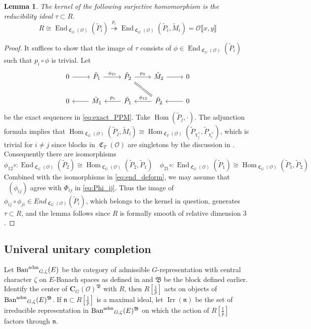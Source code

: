 \documentclass[leqno]{amsart}
\newtheorem{lem}[thm]{Lemma}
\theoremstyle{definition}
\theoremstyle{remark}
\newcommand{\oo}{\mathcal{O}}
\newcommand{\C}{\mathbf C}
\DeclareMathOperator{\End}{End}
\DeclareMathOperator{\Hom}{Hom}
\newcommand{\fn}{\mathfrak{n}}
\DeclareMathOperator{\fC}{\mathfrak{C}} %
\DeclareMathOperator{\Ban}{\textnormal{Ban}^{\textnormal{adm}}}
\DeclareMathOperator{\V}{\check{\mathbf{V}}} %
\DeclareMathOperator{\Irr}{Irr}
\newcommand{\B}{\mathfrak B} %
\begin{document}
\begin{lem}\label{lem:ker_red}
	The kernel of the following 
	surjective homomorphism 
	is the reducibility ideal $\tau\subset R$.
	\begin{equation}
	R\cong 
	\End_{\fC_G(\oo)}(\tilde{P}_i)
	\overset{p_i}{\twoheadrightarrow}
	\End_{\fC_G(\oo)}(\tilde{P}_i, \tilde{M}_i)=
	\oo\llbracket x,y\rrbracket
	\end{equation}
\end{lem}
\begin{proof}
It suffices to show that 
the image of $\tau$ consists of 
$\phi\in \End_{\fC_G(\oo)}(\tilde{P}_i)$
such that $p_i\circ \phi$ is trivial.
Let
\[
\begin{tikzcd}
	0 \arrow[r]&
	\tilde{P}_1  \arrow[r,"\phi_{21}"]  &
	\tilde{P}_2 \arrow[r,"p_2"] \arrow[dr,equal] &
	\tilde{M}_2  \arrow[r] & 0 \\
	0 & 
	\tilde{M}_1 \arrow[l]&
	\tilde{P}_1 \arrow[l,"p_1",swap]  &
	\tilde{P}_2  \arrow[l,"\phi_{12}",swap]  & 
	0  \arrow[l] 
\end{tikzcd}
\]
be the exact sequences in \eqref{eq:exact_PPM}.
Take $\Hom(\tilde{P}_j,\cdot)$.
The adjunction formula implies that
$\Hom_{\fC_G(\oo)}(\tilde{P}_j,\tilde{M}_i)\cong
\Hom_{\fC_T(\oo)}
(\tilde{P}_{\chi_j^\vee},\tilde{P}_{\chi_i^\vee})$,
which is trivial for $i\neq j$
since blocks in $\fC_T(\oo)$ are singletons
by the discussion in \cite[\S 7.2]{pask}.
Consequently there are isomorphisms
\[
	\phi_{12}\circ\colon
	\End_{\fC_G(\oo)}(\tilde{P}_2)\cong
	\Hom_{\fC_G(\oo)}(\tilde{P}_2, \tilde{P}_1)\quad
	\phi_{21}\circ\colon
	\End_{\fC_G(\oo)}(\tilde{P}_1)\cong
	\Hom_{\fC_G(\oo)}(\tilde{P}_1, \tilde{P}_2)
\]
Combined with the isomorphisms in \eqref{eq:end_deform},
we may assume that $\V(\phi_{ij})$ agree with 
$\Phi_{ij}$ in \eqref{eq:Phi_ij}.
Thus the image of 
$\phi_{ij}\circ\phi_{ji}\in End_{\fC_G(\oo)}(\tilde{P}_i)$,
which belongs to the kernel in question,
generates $\tau\subset R$,
and the lemma follows 
since  $R$ is formally smooth of relative dimension  $3$.
\end{proof}

\subsection{Univeral unitary completion}

Let $\Ban_{G,\zeta}(E)$
be the category of admissible 
$G$-representation with central character $\zeta$
on $E$-Banach spaces
as defined in \cite{pask}
and  $\B$ be the block defined earlier.
Identify the center of $\C_G(\oo)^\B$ with  $R$,
then  $R[\frac{1}{p}]$ acts on objects of $\Ban_{G,\zeta}(E)^{\B}$.
If $\fn\subset R[\frac{1}{p}]$ is a maximal ideal,
let $\Irr(\fn)$ be the set of
irreducible representation in  $\Ban_{G,\zeta}(E)^{\B}$
on which the action of $R[\frac{1}{p}]$ 
factors through $\fn$.
\end{document}
